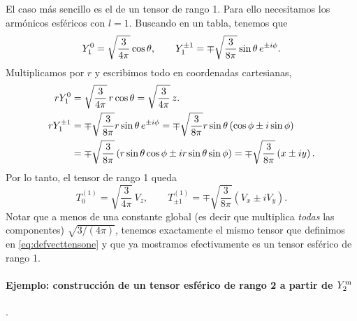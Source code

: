 \documentclass[10pt, a4paper]{article}
\numberwithin{equation}{subsection}
\begin{document}
El caso más sencillo es el de un tensor de rango 1. Para ello necesitamos los
armónicos esféricos con $l = 1$. Buscando en un tabla, tenemos que
\begin{equation}
  \SphericalHarmonic{1}{0} = \sqrt{\frac{3}{4\pi}}\cos\theta, \qquad
  \SphericalHarmonic{1}{\pm1} = \mp\sqrt{\frac{3}{8\pi}}\sin\theta\,
    e^{\pm i\phi}.
\end{equation}
Multiplicamos por $r$ y escribimos todo en coordenadas cartesianas,
\begin{align}
  r\SphericalHarmonic{1}{0} &= \sqrt{\frac{3}{4\pi}}\,r\cos\theta =
    \sqrt{\frac{3}{4\pi}}\,z. \\
  r\SphericalHarmonic{1}{\pm1} &= \mp\sqrt{\frac{3}{8\pi}}r\sin\theta\,
    e^{\pm i\phi} = \mp\sqrt{\frac{3}{8\pi}}r\sin\theta\left(\cos\phi \pm
    i\sin\phi\right) \nonumber \\
  &= \mp\sqrt{\frac{3}{8\pi}}\left(r\sin\theta\cos\phi \pm
  ir\sin\theta\sin\phi\right) = \mp\sqrt{\frac{3}{8\pi}}\left(x \pm iy\right).
\end{align}
Por lo tanto, el tensor de rango 1 queda
\begin{equation}
  T^{(1)}_{0} = \sqrt{\frac{3}{4\pi}}\,V_z, \qquad
  T^{(1)}_{\pm1} = \mp\sqrt{\frac{3}{8\pi}}\left(V_x \pm iV_y\right).
\end{equation}
Notar que a menos de una constante global (es decir que multiplica \emph{todas}
las componentes) $\sqrt{3/(4\pi)}$, tenemos exactamente el mismo tensor que
definimos en \eqref{eq:defvecttensone} y que ya mostramos efectivamente es un
tensor esférico de rango 1.

\paragraph{Ejemplo: construcción de un tensor esférico de rango 2 a partir de
  $\SphericalHarmonic{2}{m}$}.\\
\end{document}
